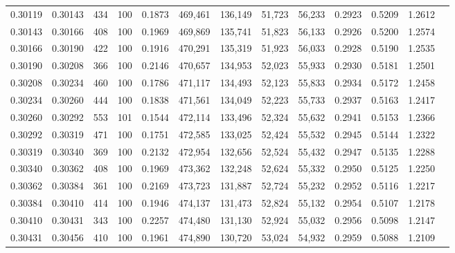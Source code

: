 \begin{tabular}{rrrrrrrrrrrrr}
0.30119 & 0.30143 &   434 & 100 &                                     0.1873 & 469,461 & 136,149 &  51,723 &  56,233 & 0.2923 & 0.5209 & 1.2612 \\
0.30143 & 0.30166 &   408 & 100 &                                     0.1969 & 469,869 & 135,741 &  51,823 &  56,133 & 0.2926 & 0.5200 & 1.2574 \\
0.30166 & 0.30190 &   422 & 100 &                                     0.1916 & 470,291 & 135,319 &  51,923 &  56,033 & 0.2928 & 0.5190 & 1.2535 \\
0.30190 & 0.30208 &   366 & 100 &                                     0.2146 & 470,657 & 134,953 &  52,023 &  55,933 & 0.2930 & 0.5181 & 1.2501 \\
0.30208 & 0.30234 &   460 & 100 &                                     0.1786 & 471,117 & 134,493 &  52,123 &  55,833 & 0.2934 & 0.5172 & 1.2458 \\
0.30234 & 0.30260 &   444 & 100 &                                     0.1838 & 471,561 & 134,049 &  52,223 &  55,733 & 0.2937 & 0.5163 & 1.2417 \\
0.30260 & 0.30292 &   553 & 101 &                                     0.1544 & 472,114 & 133,496 &  52,324 &  55,632 & 0.2941 & 0.5153 & 1.2366 \\
0.30292 & 0.30319 &   471 & 100 &                                     0.1751 & 472,585 & 133,025 &  52,424 &  55,532 & 0.2945 & 0.5144 & 1.2322 \\
0.30319 & 0.30340 &   369 & 100 &                                     0.2132 & 472,954 & 132,656 &  52,524 &  55,432 & 0.2947 & 0.5135 & 1.2288 \\
0.30340 & 0.30362 &   408 & 100 &                                     0.1969 & 473,362 & 132,248 &  52,624 &  55,332 & 0.2950 & 0.5125 & 1.2250 \\
0.30362 & 0.30384 &   361 & 100 &                                     0.2169 & 473,723 & 131,887 &  52,724 &  55,232 & 0.2952 & 0.5116 & 1.2217 \\
0.30384 & 0.30410 &   414 & 100 &                                     0.1946 & 474,137 & 131,473 &  52,824 &  55,132 & 0.2954 & 0.5107 & 1.2178 \\
0.30410 & 0.30431 &   343 & 100 &                                     0.2257 & 474,480 & 131,130 &  52,924 &  55,032 & 0.2956 & 0.5098 & 1.2147 \\
0.30431 & 0.30456 &   410 & 100 &                                     0.1961 & 474,890 & 130,720 &  53,024 &  54,932 & 0.2959 & 0.5088 & 1.2109 \\

\end{tabular}
